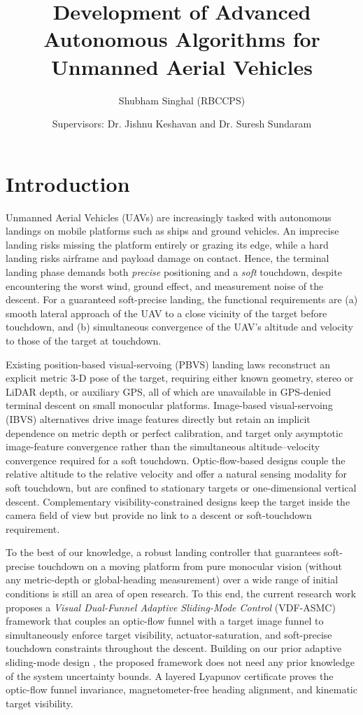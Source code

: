 \documentclass[conf]{new-aiaa}
\title{Development of Advanced Autonomous Algorithms for Unmanned Aerial Vehicles}
\author{Shubham Singhal (RBCCPS) \and
Supervisors: Dr. Jishnu Keshavan and Dr. Suresh Sundaram
}
\begin{document}
\maketitle

\section*{Introduction}
Unmanned Aerial Vehicles (UAVs) are increasingly tasked with autonomous landings on mobile platforms such as ships and ground vehicles. An imprecise landing risks missing the platform entirely or grazing its edge, while a hard landing risks airframe and payload damage on contact. Hence, the terminal landing phase demands both \emph{precise} positioning and a \emph{soft} touchdown, despite encountering the worst wind, ground effect, and measurement noise of the descent. For a guaranteed soft-precise landing, the functional requirements are (a) smooth lateral approach of the UAV to a close vicinity of the target before touchdown, and (b) simultaneous convergence of the UAV's altitude and velocity to those of the target at touchdown.

Existing position-based visual-servoing (PBVS) landing laws \cite{lin2022, zhang2026} reconstruct an explicit metric 3-D pose of the target, requiring either known geometry, stereo or LiDAR depth, or auxiliary GPS, all of which are unavailable in GPS-denied terminal descent on small monocular platforms. Image-based visual-servoing (IBVS) alternatives \cite{chaumette2006, cho2022, chen2025} drive image features directly but retain an implicit dependence on metric depth or perfect calibration, and target only asymptotic image-feature convergence rather than the simultaneous altitude--velocity convergence required for a soft touchdown. Optic-flow-based designs \cite{herisse2012, singhal2025} couple the relative altitude to the relative velocity and offer a natural sensing modality for soft touchdown, but are confined to stationary targets or one-dimensional vertical descent. Complementary visibility-constrained designs \cite{salehi2021} keep the target inside the camera field of view but provide no link to a descent or soft-touchdown requirement.

To the best of our knowledge, a robust landing controller that guarantees soft-precise touchdown on a moving platform from pure monocular vision (without any metric-depth or global-heading measurement) over a wide range of initial conditions is still an area of open research. To this end, the current research work proposes a \emph{Visual Dual-Funnel Adaptive Sliding-Mode Control} (VDF-ASMC) framework that couples an optic-flow funnel with a target image funnel to simultaneously enforce target visibility, actuator-saturation, and soft-precise touchdown constraints throughout the descent. Building on our prior adaptive sliding-mode design \cite{singhal2025}, the proposed framework does not need any prior knowledge of the system uncertainty bounds. A layered Lyapunov certificate proves the optic-flow funnel invariance, magnetometer-free heading alignment, and kinematic target visibility.
\end{document}
